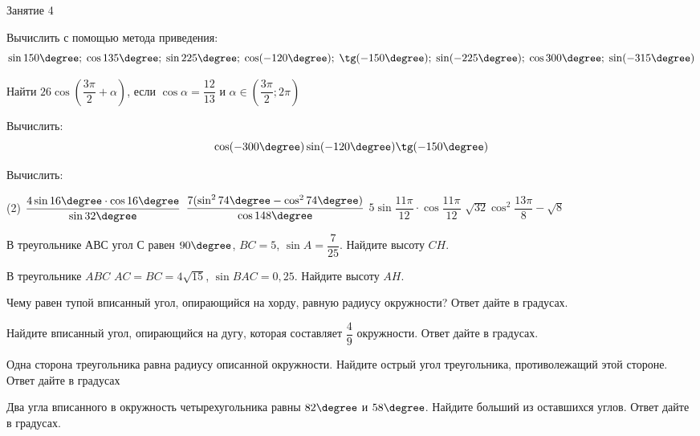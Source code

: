 \begin{class}[number=4]
	\begin{listofex}
		\item Занятие 4
	\end{listofex}
\end{class}

\begin{homework}[number=2]
	\begin{listofex}
		\item Вычислить с помощью метода приведения: \[ \sin150\degree;\;\cos135\degree;\;\sin225\degree;\;\cos(-120\degree);\;\tg(-150\degree);\;\sin(-225\degree);\;\cos300\degree;\;\sin(-315\degree) \]
		\item Найти \( 26\cos\left( \dfrac{3\pi}{2}+\alpha \right) \), если \( \cos\alpha=\dfrac{12}{13} \) и \( \alpha\in\left( \dfrac{3\pi}{2}; 2\pi \right) \)
		\item Вычислить:
		\[ \cos(-300\degree)\sin(-120\degree)\tg(-150\degree) \]
		
		\item Вычислить:
		\begin{tasks}(2)
			\task \( \dfrac{4\sin16\degree\cdot\cos16\degree}{\sin32\degree} \)
			\task \( \dfrac{7(\sin^274\degree-\cos^274\degree)}{\cos148\degree} \)
			\task \( 5\sin\dfrac{11\pi}{12}\cdot\cos\dfrac{11\pi}{12} \)
			\task \( \sqrt{32}\cos^2\dfrac{13\pi}{8}-\sqrt{8} \)
		\end{tasks}
		\item В треугольнике \( АВС \) угол \( С \) равен \( 90\degree \), \( BC = 5 \),  \( \sin A = \dfrac{7}{25} \).  Найдите высоту \( CH \).
		\item В треугольнике \( ABC \) \( AC = BC = 4\sqrt{15 }\),  \( \sin BAC = 0,25 \). Найдите высоту \( AH \). 
		\item Чему равен тупой вписанный угол, опирающийся на хорду, равную радиусу окружности? Ответ дайте в градусах.
		\item Найдите вписанный угол, опирающийся на дугу, которая составляет \( \dfrac{4}{9} \) окружности. Ответ дайте в градусах.
		\item Одна сторона треугольника равна радиусу описанной окружности. Найдите острый угол треугольника, противолежащий этой стороне. Ответ дайте в градусах
		\item Два угла вписанного в окружность четырехугольника равны \( 82\degree\) и \( 58\degree \). Найдите больший из оставшихся углов. Ответ дайте в градусах.
	\end{listofex}
\end{homework}

